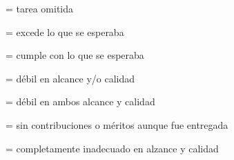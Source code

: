 \begin{description}[itemsep=-2pt]
\item[NP]{= tarea omitida}
\item[5]{= excede lo que se esperaba}
\item[4]{= cumple con lo que se esperaba}
\item[3]{= d\'{e}bil en alcance y/o calidad}
\item[2]{= d\'{e}bil en ambos alcance y calidad}
\item[1]{= sin contribuciones o m\'{e}ritos aunque fue entregada}
\item[0]{= completamente inadecuado en alzance y calidad}
\end{description}
